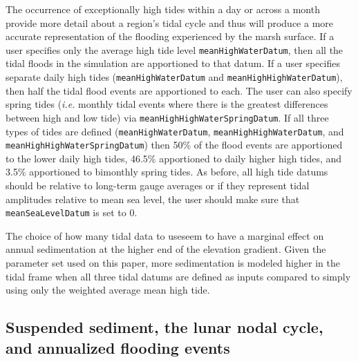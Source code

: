 The occurrence of exceptionally high tides within a day or across a
month provide more detail about a region's tidal cycle and thus will
produce a more accurate representation of the flooding experienced by
the marsh surface. If a user specifies only the average high tide level
\texttt{meanHighWaterDatum}, then all the tidal floods in the simulation
are apportioned to that datum. If a user specifies separate daily high
tides (\texttt{meanHighWaterDatum} and \texttt{meanHighHighWaterDatum}),
then half the tidal flood events are apportioned to each. The user can
also specify spring tides (\emph{i.e.} monthly tidal events where there
is the greatest differences between high and low tide) via
\texttt{meanHighHighWaterSpringDatum}. If all three types of tides are
defined (\texttt{meanHighWaterDatum}, \texttt{meanHighHighWaterDatum},
and \texttt{meanHighHighWaterSpringDatum}) then 50\% of the flood events
are apportioned to the lower daily high tides, 46.5\% apportioned to
daily higher high tides, and 3.5\% apportioned to bimonthly spring
tides. As before, all high tide datums should be relative to long-term
gauge averages or if they represent tidal amplitudes relative to mean
sea level, the user should make sure that \texttt{meanSeaLevelDatum} is
set to 0.

The choice of how many tidal data to useseem to have a marginal effect
on annual sedimentation at the higher end of the elevation gradient.
Given the parameter set used on this paper, more sedimentation is
modeled higher in the tidal frame when all three tidal datums are
defined as inputs compared to simply using only the weighted average
mean high tide.

\hypertarget{suspended-sediment-the-lunar-nodal-cycle-and-annualized-flooding-events}{%
\subsection{Suspended sediment, the lunar nodal cycle, and annualized
flooding
events}\label{suspended-sediment-the-lunar-nodal-cycle-and-annualized-flooding-events}}

